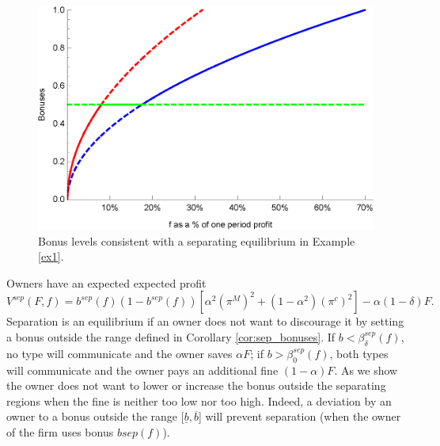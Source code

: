 \documentclass[]{article}
\begin{document}
\begin{figure}[ht]
\centering
\includegraphics[scale=0.8]{Plots/Bertrand_bonuses_diff.eps}
\caption{Bonus levels consistent with a separating equilibrium in Example \ref{ex1}.}\label{fig:bonuses}
\end{figure}

Owners have an expected expected profit
\begin{equation}\label{eq:sep_profit}
V^{sep}(F,f)=b^{sep}(f)(1-b^{sep}(f)) \left[ \alpha^2 (\pi^M)^2 + (1-\alpha^2) (\pi^c)^2 \right] - \alpha (1-\delta)F.
\end{equation}
%
Separation is an equilibrium if an owner does not want to discourage it by setting a bonus outside the range defined in Corollary \ref{cor:sep_bonuses}. If $b<\beta^{sep}_\delta(f)$, no type will communicate and the owner saves $\alpha F$; if $b>\beta^{sep}_0(f)$, both types will communicate and the owner pays an additional fine $(1-\alpha)F$. As we show the owner does not want to lower or increase the bonus outside the separating regions when the fine is neither too low nor too high. Indeed, a deviation by an owner to a bonus outside the range $[\underline b,\overline b$] will prevent separation (when the owner of the firm uses bonus $b{sep}(f)$).
%
\end{document}
